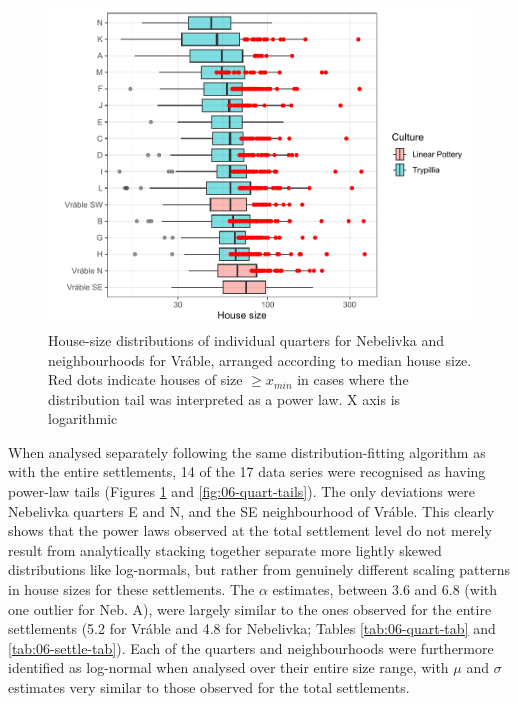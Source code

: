 \documentclass[
  12pt,
  a4paper, twoside]{book}
\begin{document}
\begin{figure}

{\centering \includegraphics[width=0.9\linewidth]{bookdown-demo_files/figure-latex/06-quart-box-1} 

}

\caption[House sizes by quarter (Nebelivka) and neighbourhood (Vráble)]{House-size distributions of individual quarters for Nebelivka and neighbourhoods for Vráble, arranged according to median house size. Red dots indicate houses of size \(\geq x_{min}\) in cases where the distribution tail was interpreted as a power law. X axis is logarithmic}\label{fig:06-quart-box}
\end{figure}

When analysed separately following the same distribution-fitting algorithm as with the entire settlements, 14 of the 17 data series were recognised as having power-law tails (Figures \ref{fig:06-quart-box} and \ref{fig:06-quart-tails}). The only deviations were Nebelivka quarters E and N, and the SE neighbourhood of Vráble. This clearly shows that the power laws observed at the total settlement level do not merely result from analytically stacking together separate more lightly skewed distributions like log-normals, but rather from genuinely different scaling patterns in house sizes for these settlements. The \(\alpha\) estimates, between 3.6 and 6.8 (with one outlier for Neb. A), were largely similar to the ones observed for the entire settlements (5.2 for Vráble and 4.8 for Nebelivka; Tables \ref{tab:06-quart-tab} and \ref{tab:06-settle-tab}). Each of the quarters and neighbourhoods were furthermore identified as log-normal when analysed over their entire size range, with \(\mu\) and \(\sigma\) estimates very similar to those observed for the total settlements.
\end{document}
